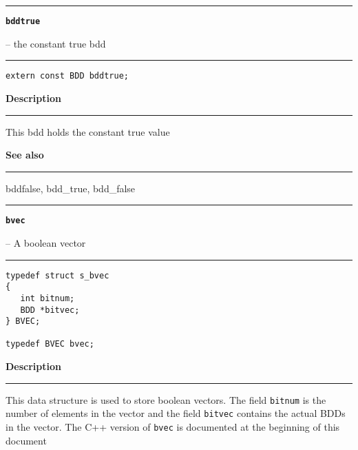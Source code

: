 \vspace{8ex}
\begin{minipage}{\textwidth}

\noindent\begin{minipage}{\textwidth}
\rule{\textwidth}{0.5mm}
{\tt\bf bddtrue }
\--- the constant true bdd  \hspace{\fill}
\\\rule[1.5ex]{\textwidth}{0.5mm}
\end{minipage}

\noindent\begin{verbatim}
extern const BDD bddtrue; 
\end{verbatim}

\vspace{\parsep}\noindent
{\bf Description}\\\rule[1.5ex]{\textwidth}{0.2mm}\vspace{-1.5ex}\setlength{\parindent}{1em}
This bdd holds the constant true value 

\vspace{\parsep}\vspace{\baselineskip}\noindent
{\bf See also}\\\rule[1.5ex]{\textwidth}{0.2mm}\vspace{-1.5ex}
bddfalse, bdd\_true, bdd\_false 
\end{minipage}
\vspace{8ex}
\begin{minipage}{\textwidth}

\noindent\begin{minipage}{\textwidth}
\rule{\textwidth}{0.5mm}
{\tt\bf bvec }
\--- A boolean vector  \hspace{\fill}
\\\rule[1.5ex]{\textwidth}{0.5mm}
\end{minipage}

\noindent\begin{verbatim}
typedef struct s_bvec
{
   int bitnum;
   BDD *bitvec;
} BVEC;

typedef BVEC bvec; 
\end{verbatim}

\vspace{\parsep}\noindent
{\bf Description}\\\rule[1.5ex]{\textwidth}{0.2mm}\vspace{-1.5ex}\setlength{\parindent}{1em}
This data structure is used to store boolean vectors. The field
           {\tt bitnum} is the number of elements in the vector and the
	   field {\tt bitvec} contains the actual BDDs in the vector.
	   The C++ version of {\tt bvec} is documented at the beginning of
	   this document 
\end{minipage}
